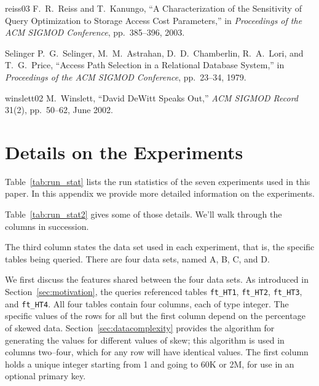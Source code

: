 \documentclass[prodmode,acmtods]{acmsmall}
\begin{document}
\begin{thebibliography}{99}
\bibitem
{reiss03}
F.~R.~Reiss and T.~Kanungo, ``A Characterization of the Sensitivity of Query
Optimization to Storage Access Cost Parameters,'' in {\em Proceedings of the
  ACM SIGMOD Conference}, pp.~385--396, 2003.

\bibitem
{Selinger}
P.~G.~Selinger, M.~M.~Astrahan, D.~D.~Chamberlin, R.~A.~Lori, and
T.~G.~Price, ``Access Path Selection in a Relational Database System,''
in {\em Proceedings of the ACM SIGMOD Conference}, pp.~23--34, 1979.

\bibitem
{winslett02}
M.~Winslett, ``David DeWitt Speaks Out,'' {\em ACM SIGMOD
  Record} 31(2), pp.~50--62, June 2002. 



\end{thebibliography}

\newpage
\appendix
\section{Details on the Experiments}\label{sec:app}
Table~\ref{tab:run_stat} lists the run statistics of the seven experiments
  used in this paper. In this appendix we provide more detailed information
  on the experiments.

Table~\ref{tab:run_stat2} gives some of those details. We'll walk through
the columns in succession.

The third column states the data set used in each experiment, that is, the
specific tables being queried. There are four data sets, named A, B, C, and
D.

We first discuss the features shared between the four data sets. As
introduced in Section~\ref{sec:motivation}, the queries referenced tables
{\tt ft\_HT1}, {\tt ft\_HT2}, {\tt ft\_HT3}, and {\tt ft\_HT4}. All four
tables contain four columns, each of type integer. The specific values of
the rows for all but the first column depend
on the percentage of skewed data. Section~\ref{sec:datacomplexity} provides
the algorithm for generating the values for different values of skew; this
algorithm is used in columns two--four, which for any row will have
identical values. The first column holds a unique integer starting from 1
and going to 60K or 2M, for use in an optional primary key.
\end{document}
